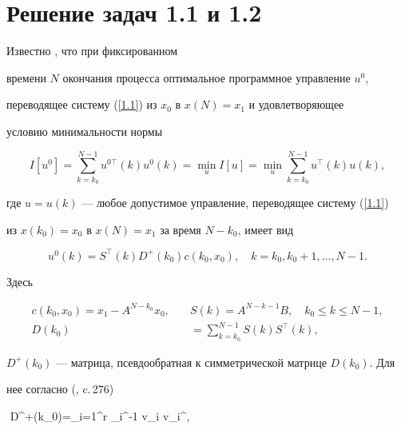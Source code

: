 \section{Решение задач 1.1 и 1.2}





Известно \cite{2}, что при фиксированном


времени $N$ окончания процесса оптимальное программное управление $u^0$,


переводящее систему (\ref{1.1}) из $x_0$ в $x(N)=x_1$ и удовлетворяющее


условию минимальности нормы


\begin{equation}\label{2.1}


I[u^0] = \sum_{k=k_0}^{N-1} u^{0 \top}(k) u^0(k) = \min_{u}


I[u] = \min_{u} \sum_{k=k_0}^{N-1} u^{\top}(k) u(k),


\end{equation}


где $u=u(k)$ --- любое допустимое управление, переводящее систему (\ref{1.1})


из $x(k_0)=x_0$ в $x(N)=x_1$ за время $N-k_0$, имеет вид


\begin{equation}\label{2.3}


u^0(k)=S^{\top}(k) D^+(k_0) c(k_0, x_0),\quad k=k_0, k_0+1, \dotsc, N-1.


\end{equation}


Здесь


\begin{equation}\label{2.2}


\begin{split}


c(k_0, x_0)=x_1 - A^{N-k_0} x_0,\quad &S(k)=A^{N-k-1}B,\quad k_0\le k \le


N-1,\\


D(k_0)&= \sum_{k=k_0}^{N-1} S(k) S^{\top}(k),


\end{split}


\end{equation}


$D^+(k_0)$ --- матрица, псевдообратная к симметрической матрице $D(k_0)$. Для


нее согласно (\cite{Voev}, c.\,276)


$$ D^+(k_0)=\sum_{i=1}^r \lambda_i^{-1} v_i v_i^{\top},


